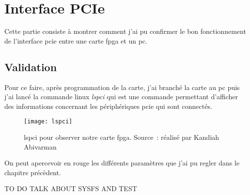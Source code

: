 \newpage

\section{Interface PCIe}

Cette partie consiste à montrer comment j'ai pu confirmer le bon fonctionnement de l'interface \gls{pcie} entre une carte \gls{fpga} et un \gls{pc}.

\subsection{Validation}

Pour ce faire, après programmation de la carte, j'ai branché la carte au \gls{pc} puis j'ai lancé la commande linux \textit{lspci} qui est une commande permettant d'afficher des informations
concernant les périphériques \gls{pcie} qui sont connectés.

\begin{figure}[tbph!]
	\centering
	\texttt{[image: lspci]}
	\caption[lspci pour observer notre carte FPGA]{lspci pour observer notre carte fpga. Source : réalisé par Kandiah Abivarman}
	\label{fig:lspci}
\end{figure}

On peut apercevoir en rouge les différents paramètres que j'ai pu regler dans le chapitre précèdent.

TO DO TALK ABOUT SYSFS AND TEST